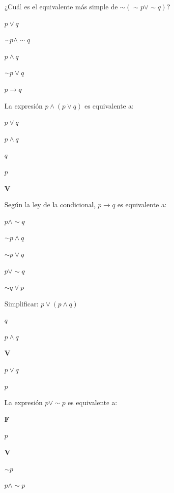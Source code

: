 \begin{multicols}{2}
\setcounter{numejercicio}{0}

\ejercicio ¿Cuál es el equivalente más simple de $\sim(\sim p \vee \sim q)$?
\begin{alternativas}
  \item $p \vee q$
  \item $\sim p \wedge \sim q$
  \item $p \wedge q$
  \item $\sim p \vee q$
  \item $p \rightarrow q$
\end{alternativas}
\vspace{0.3cm}

\ejercicio La expresión $p \wedge (p \vee q)$ es equivalente a:
\begin{alternativas}
  \item $p \vee q$
  \item $p \wedge q$
  \item $q$
  \item $p$
  \item $\mathbf{V}$
\end{alternativas}
\vspace{0.3cm}

\ejercicio Según la ley de la condicional, $p \rightarrow q$ es equivalente a:
\begin{alternativas}
  \item $p \wedge \sim q$
  \item $\sim p \wedge q$
  \item $\sim p \vee q$
  \item $p \vee \sim q$
  \item $\sim q \vee p$
\end{alternativas}
\vspace{0.3cm}

\ejercicio Simplificar: $p \vee (p \wedge q)$
\begin{alternativas}
  \item $q$
  \item $p \wedge q$
  \item $\mathbf{V}$
  \item $p \vee q$
  \item $p$
\end{alternativas}
\vspace{0.3cm}

\ejercicio La expresión $p \vee \sim p$ es equivalente a:
\begin{alternativas}
  \item $\mathbf{F}$
  \item $p$
  \item $\mathbf{V}$
  \item $\sim p$
  \item $p \wedge \sim p$
\end{alternativas}
\vspace{0.3cm}

\end{multicols}

